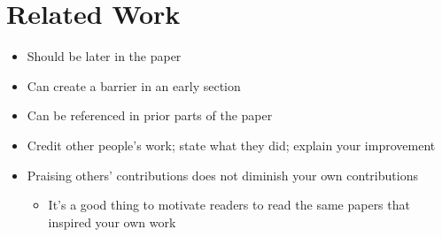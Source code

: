 \documentclass[11pt,a4paper]{article}
\begin{document}
\section{Related Work}

\begin{itemize}
\item Should be later in the paper
\item Can create a barrier in an early section
\item Can be referenced in prior parts of the paper
\item Credit other people's work; state what they did; explain your improvement
\item Praising others' contributions does not diminish your own contributions
    \begin{itemize}
    \item It's a good thing to motivate readers to read the same papers that inspired your own work
    \end{itemize}
\end{itemize}
\end{document}
